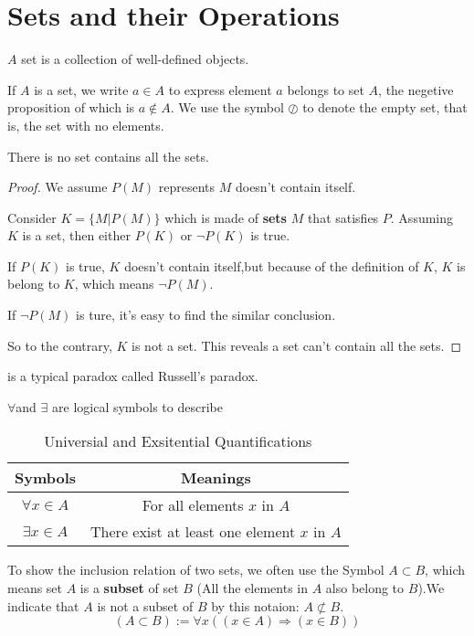 \section{Sets and their Operations}

$A$ set is a collection of well-defined objects.

If $A$ is a set, we write $a \in A$ to express element $a$ belongs to set $A$, the negetive proposition of which is $a \notin A$. We use the symbol $\oslash$ to denote the empty set, that is, the set with no elements.

\begin{theorem}[Cantor]\label{thm:Russell's paradox}
    There is no set contains all the sets.
\end{theorem}
\begin{proof}
    We assume $P(M)$ represents $M$ doesn't contain itself.

    Consider $K=\{M|P(M)\}$ which is made of \textbf{sets} $M$ that satisfies  $P$. Assuming $K$ is a set, then either $P(K)$ or $\lnot P(K)$ is true.
    
    If $P(K)$ is true, $K$ doesn't contain itself,but because of the definition of $K$, $K$ is belong to $K$, which means $\lnot P(M)$.

    If $\lnot P(M)$ is ture, it's easy to find the similar conclusion.

    So to the contrary, $K$ is not a set. This reveals a set can't contain all the sets.
\end{proof}

 is a typical paradox called Russell's paradox.

$\forall $and $\exists $ are logical symbols to describe
\begin{table}[H]
    \centering
    \caption{Universial and Exsitential Quantifications}
    \begin{tabular}{|c|c|}\hline
        Symbols&Meanings\\\hline
        $\forall x \in A$&For all elements $x$ in $A$\\
        $\exists x \in A$&There exist at least one element $x$ in $A$\\
        \hline
    \end{tabular}
\end{table}
To show the inclusion relation of two sets, we often use the Symbol $A \subset B$, which means set $A$ is a \textbf{subset} of set $B$ (All the elements in $A$ also belong to $B$).We indicate that $A$ is not a subset of $B$ by this notaion: $A \not\subset B$.
\[(A\subset B ):=\forall x((x\in A)\Rightarrow (x\in B))\]

